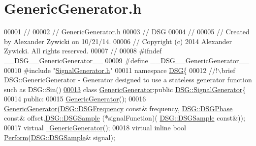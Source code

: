 \hypertarget{_generic_generator_8h_source}{\section{Generic\+Generator.\+h}
\label{_generic_generator_8h_source}
}

\begin{DoxyCode}
00001 \textcolor{comment}{//}
00002 \textcolor{comment}{//  GenericGenerator.h}
00003 \textcolor{comment}{//  DSG}
00004 \textcolor{comment}{//}
00005 \textcolor{comment}{//  Created by Alexander Zywicki on 10/21/14.}
00006 \textcolor{comment}{//  Copyright (c) 2014 Alexander Zywicki. All rights reserved.}
00007 \textcolor{comment}{//}
00008 \textcolor{preprocessor}{#ifndef \_\_DSG\_\_GenericGenerator\_\_}
00009 \textcolor{preprocessor}{#define \_\_DSG\_\_GenericGenerator\_\_}
00010 \textcolor{preprocessor}{#include "\hyperlink{_signal_generator_8h}{SignalGenerator.h}"}
00011 \textcolor{keyword}{namespace }\hyperlink{namespace_d_s_g}{DSG}\{\textcolor{comment}{}
00012 \textcolor{comment}{    //!\(\backslash\)brief DSG::GenericGenerator - Generator designed to use a stateless generator function such as
       DSG::Sin()}
\hypertarget{_generic_generator_8h_source_l00013}{}\hyperlink{class_d_s_g_1_1_generic_generator}{00013} \textcolor{comment}{}    \textcolor{keyword}{class }\hyperlink{class_d_s_g_1_1_generic_generator}{GenericGenerator}:\textcolor{keyword}{public} \hyperlink{class_d_s_g_1_1_signal_generator}{DSG::SignalGenerator}\{
00014     \textcolor{keyword}{public}:
00015         \hyperlink{class_d_s_g_1_1_generic_generator_a560df325ce43fa9a1baf4463ccaed2d3}{GenericGenerator}();
00016         \hyperlink{class_d_s_g_1_1_generic_generator_a560df325ce43fa9a1baf4463ccaed2d3}{GenericGenerator}(\hyperlink{namespace_d_s_g_a4315a061386fa1014fda09b15d3a6973}{DSG::DSGFrequency} \textcolor{keyword}{const}& frequency,
      \hyperlink{namespace_d_s_g_a44431ce1eb0a7300efdd207bc879e52c}{DSG::DSGPhase} \textcolor{keyword}{const}& offset,\hyperlink{namespace_d_s_g_ac39a94cd27ebcd9c1e7502d0c624894a}{DSG::DSGSample} (*signalFunction)(
      \hyperlink{namespace_d_s_g_ac39a94cd27ebcd9c1e7502d0c624894a}{DSG::DSGSample} \textcolor{keyword}{const}&));
00017         \textcolor{keyword}{virtual} \hyperlink{class_d_s_g_1_1_generic_generator_aeaca1efdba7186a8b3b1879b092e7bec}{~GenericGenerator}();
00018         \textcolor{keyword}{virtual} \textcolor{keyword}{inline} \textcolor{keywordtype}{bool} \hyperlink{class_d_s_g_1_1_generic_generator_addcd9abbbf0e31f0af2ff18217a08302}{Perform}(\hyperlink{namespace_d_s_g_ac39a94cd27ebcd9c1e7502d0c624894a}{DSG::DSGSample}& signal);

\end{DoxyCode}
